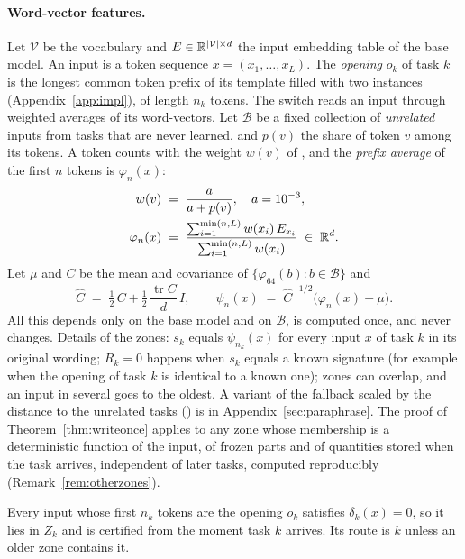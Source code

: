 \paragraph{Word-vector features.} Let $\mathcal{V}$ be the vocabulary and $E \in \mathbb{R}^{|\mathcal{V}| \times d}$ the input embedding
table of the base model. An input is a token sequence $x=(x_1,\dots,x_L)$. The \emph{opening} $o_k$ of task $k$ is the longest common token prefix of its template
filled with two instances (Appendix~\ref{app:impl}), of length $n_k$ tokens. The switch reads an input through weighted averages of its word-vectors. Let $\mathcal{B}$ be a
fixed collection of \emph{unrelated} inputs from tasks that are never learned, and $p(v)$ the share
of token $v$ among its tokens. A token counts with the weight $w(v)$ of \citet{arora2017simple}, and the \emph{prefix average} of the
first $n$ tokens is $\varphi_n(x)$:
\begin{align}
  w(v) &\;=\; \frac{a}{a + p(v)} , \quad a = 10^{-3}, \label{eq:weights}\\
  \varphi_n(x) &\;=\; \frac{\sum_{i=1}^{\min(n, L)} w(x_i)\, E_{x_i}}{\sum_{i=1}^{\min(n, L)} w(x_i)} \;\in\; \mathbb{R}^d .
  \label{eq:prefix}
\end{align}
Let $\mu$ and $C$ be the mean and covariance of $\{\varphi_{64}(b) : b \in \mathcal{B}\}$ and
\begin{equation}
  \hat{C} \;=\; \tfrac{1}{2}\, C + \tfrac{1}{2}\, \frac{\operatorname{tr} C}{d}\, I ,
  \qquad
  \psi_n(x) \;=\; \hat{C}^{-1/2} \bigl( \varphi_n(x) - \mu \bigr) .
  \label{eq:whiten}
\end{equation}
All this depends only on the base model and on $\mathcal{B}$, is computed once, and never changes.
Details of the zones: $s_k$ equals $\psi_{n_k}(x)$ for every input $x$ of task $k$ in its original wording; $R_k = 0$ happens when $s_k$ equals a known signature (for example when the opening of task $k$ is identical to a known one); zones can overlap, and an input in several goes to the oldest. A variant of the fallback scaled by the distance to the unrelated tasks (\certscaled{}) is in Appendix~\ref{sec:paraphrase}. The proof of Theorem~\ref{thm:writeonce} applies to any zone whose membership is a deterministic function of the input, of frozen parts and of quantities stored when the task arrives, independent of later tasks, computed reproducibly (Remark~\ref{rem:otherzones}).

\begin{proposition}
\label{prop:own}
Every input whose first $n_k$ tokens are the opening $o_k$ satisfies $\delta_k(x) = 0$, so it lies in
$Z_k$ and is certified from the moment task $k$ arrives. Its route is $k$ unless an older
zone contains it.
\end{proposition}

